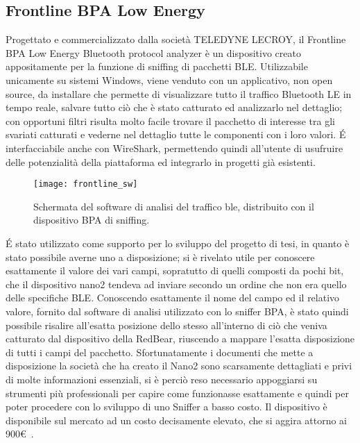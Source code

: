 \subsection*{Frontline BPA Low Energy}
Progettato e commercializzato dalla società TELEDYNE LECROY, il Frontline BPA Low Energy Bluetooth protocol analyzer è un dispositivo creato appositamente per la funzione di sniffing di pacchetti BLE. Utilizzabile unicamente su sistemi Windows, viene venduto con un applicativo, non open source, da installare che permette di visualizzare tutto il traffico Bluetooth LE in tempo reale, salvare tutto ciò che è stato catturato ed analizzarlo nel dettaglio; con opportuni filtri risulta molto facile trovare il pacchetto di interesse tra gli svariati catturati e vederne nel dettaglio tutte le componenti con i loro valori. \'E interfacciabile anche con WireShark, permettendo quindi all'utente di usufruire delle potenzialità della piattaforma ed integrarlo in progetti già esistenti.

\begin{figure}[H]
\texttt{[image: frontline\_sw]}
\centering
\caption{Schermata del software di analisi del traffico ble, distribuito con il dispositivo BPA di sniffing. }
\end{figure}

\'E stato utilizzato come supporto per lo sviluppo del progetto di tesi, in quanto è stato possibile averne uno a disposizione; si è rivelato utile per conoscere esattamente il valore dei vari campi, sopratutto di quelli composti da pochi bit, che il dispositivo nano2 tendeva ad inviare secondo un ordine che non era quello delle specifiche BLE. Conoscendo esattamente il nome del campo ed il relativo valore, fornito dal software di analisi utilizzato con lo sniffer BPA, è stato quindi possibile risalire all'esatta posizione dello stesso all'interno di ciò che veniva catturato dal dispositivo della RedBear, riuscendo a mappare l'esatta disposizione di tutti i campi del pacchetto. Sfortunatamente i documenti che mette a disposizione la società che ha creato il Nano2 sono scarsamente dettagliati e privi di molte informazioni essenziali, si è perciò reso necessario appoggiarsi su strumenti più professionali per capire come funzionasse esattamente e quindi per poter procedere con lo sviluppo di uno Sniffer a basso costo.
Il dispositivo è disponibile sul mercato ad un costo decisamente elevato, che si aggira attorno ai 900\euro\ .